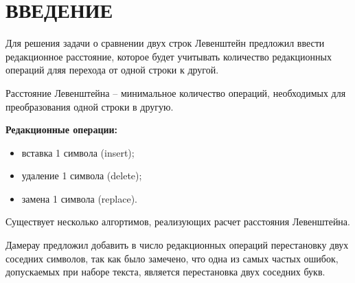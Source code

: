 \titleformat{\section}[hang]
{\bfseries\normalsize\filcenter}{\thesection}{1em}{}
\titlespacing\section{\parindent}{\parskip}{\parskip}
\section*{ВВЕДЕНИЕ}

Для решения задачи о сравнении двух строк Левенштейн предложил ввести редакционное расстояние, которое будет учитывать количество 
редакционных операций дляя перехода от одной строки к другой.\par 
Расстояние Левенштейна -- минимальное количество операций, необходимых для преобразования одной строки в другую.\par
{\bf Редакционные операции:}
\begin{itemize}
    \item вставка 1 символа (insert);
    \item удаление 1 символа (delete);
    \item замена 1 символа (replace).
\end{itemize}

Существует несколько алгортимов, реализующих расчет расстояния Левенштейна.\par
Дамерау предложил добавить в число редакционных операций перестановку двух соседних символов, так как было замечено, что одна
из самых частых ошибок, допускаемых при наборе текста, является перестановка двух соседних букв. 

\pagebreak